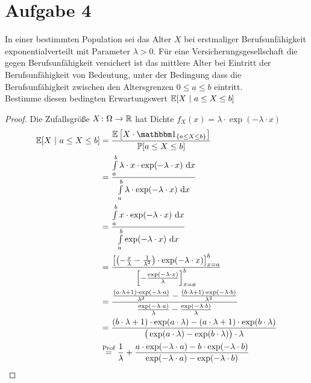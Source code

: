 \documentclass[12pt,a4paper]{article}
\begin{document}
\section*{Aufgabe 4}
In einer bestimmten Population sei das Alter $X$ bei erstmaliger
Berufsunfähigkeit exponentialverteilt mit Parameter $\lambda>0$. Für eine Versicherungsgesellschaft die gegen Berufsunfähigkeit versichert ist das mittlere Alter bei Eintritt der Berufsunfähigkeit von Bedeutung, unter der Bedingung dass die Berufsunfähigkeit zwischen den Altersgrenzen $0\leq a\leq b$ eintritt.\\
Bestimme diesen bedingten Erwartungswert $\mathbb{E}[X~|~a\leq X\leq b]$
\begin{proof}
Die Zufallsgröße $X\colon\Omega\to\mathbb{R}$ hat Dichte $f_X(x)=\lambda\cdot\exp(-\lambda\cdot x)$
\begin{align*}
\E[X~|~a\leq X\leq b]
&=\frac{\E\left[X\cdot\indi_{\lbrace a\leq X\leq b\rbrace}\right]}{\P[a\leq X\leq b]}\\
&=\frac{\int\limits_a^b \lambda\cdot x\cdot\exp(-\lambda\cdot x)\d x}{\int\limits_a^b\lambda\cdot\exp(-\lambda\cdot x)\d x}\\
&=\frac{\int\limits_a^b x\cdot\exp(-\lambda\cdot x)\d x}{\int\limits_a^b\exp(-\lambda\cdot x)\d x}\\
&=\frac{\left[\left(-\frac{x}{\lambda}-\frac{1}{\lambda^2}\right)\cdot\exp(-\lambda\cdot x)\right]_{x=a}^b}
{\left[-\frac{\exp(-\lambda\cdot x)}{\lambda}\right]_{x=a}^b}\\
&=\frac{\frac{(a\cdot\lambda+1)\cdot\exp(-\lambda\cdot a)}{\lambda^2}-\frac{(b\cdot\lambda+1)\cdot\exp(-\lambda\cdot b)}{\lambda^2}}{\frac{\exp(-\lambda\cdot a)}{\lambda}-\frac{\exp(-\lambda\cdot b)}{\lambda}}\\
&=\frac{(b\cdot\lambda+1)\cdot\exp(a\cdot\lambda)-(a\cdot\lambda+1)\cdot\exp(b\cdot\lambda)}{\big(\exp(a\cdot\lambda)-\exp(b\cdot\lambda)\big)\cdot\lambda}\\
&\stackeq{\text{Prof}}
\frac{1}{\lambda}+\frac{a\cdot\exp(-\lambda\cdot a)-b\cdot\exp(-\lambda\cdot b)}{\exp(-\lambda\cdot a)-\exp(-\lambda\cdot b)}
\end{align*}
\end{proof}
\end{document}
